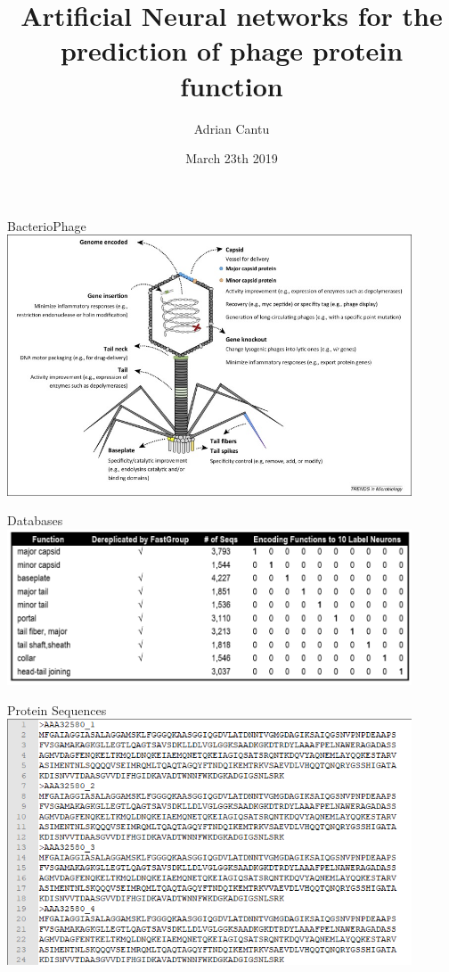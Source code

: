 \documentclass{beamer}
\title[VII meeting - 2019]{Artificial Neural networks for the prediction of phage protein function }
\author[A. Cantu]{Adrian Cantu}
\institute[]{
  San Diego State University \\
  Computational Science Research Center}
\date[03/23/2019]{
  March 23th 2019}
\begin{document}
\begin{frame}
  \titlepage
  \centering
\end{frame}


\begin{frame}{BacterioPhage}
\includegraphics[width=0.90\textwidth]{img01}
\end{frame}

\begin{frame}{Databases}
\includegraphics[width=0.90\textwidth]{img02_databases}
\end{frame}

\begin{frame}{Protein Sequences}
\includegraphics[width=0.90\textwidth]{fasta}
\end{frame}
\end{document}

